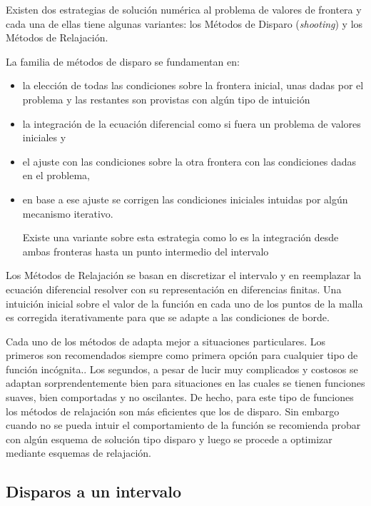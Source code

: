 \documentclass[spanish,titlepage,11pt]{article}
\begin{document}
Existen dos estrategias de soluci\'{o}n num\'{e}rica al problema de valores de
frontera y cada una de ellas tiene algunas variantes: los M\'{e}todos de
Disparo (\textit{shooting}) y los M\'{e}todos de Relajaci\'{o}n.

La familia de m\'{e}todos de disparo se fundamentan en:

\begin{itemize}
\item  la elecci\'{o}n de todas las condiciones sobre la frontera inicial,
unas dadas por el problema y las restantes son provistas con alg\'{u}n tipo de
intuici\'{o}n

\item  la integraci\'{o}n de la ecuaci\'{o}n diferencial como si fuera un
problema de valores iniciales y

\item  el ajuste con las condiciones sobre la otra frontera con las
condiciones dadas en el problema,

\item  en base a ese ajuste se corrigen las condiciones iniciales intuidas por
alg\'{u}n mecanismo iterativo.

Existe una variante sobre esta estrategia como lo es la integraci\'{o}n desde
ambas fronteras hasta un punto intermedio del intervalo
\end{itemize}

Los M\'{e}todos de Relajaci\'{o}n se basan en discretizar el intervalo y en
reemplazar la ecuaci\'{o}n diferencial resolver con su representaci\'{o}n en
diferencias finitas. Una intuici\'{o}n inicial sobre el valor de la
funci\'{o}n en cada uno de los puntos de la malla es corregida iterativamente
para que se adapte a las condiciones de borde.

Cada uno de los m\'{e}todos de adapta mejor a situaciones particulares. Los
primeros son recomendados siempre como primera opci\'{o}n para cualquier tipo
de funci\'{o}n inc\'{o}gnita.. Los segundos, a pesar de lucir muy complicados
y costosos se adaptan sorprendentemente bien para situaciones en las cuales se
tienen funciones suaves, bien comportadas y no oscilantes. De hecho, para este
tipo de funciones los m\'{e}todos de relajaci\'{o}n son m\'{a}s eficientes que
los de disparo. Sin embargo cuando no se pueda intuir el comportamiento de la
funci\'{o}n se recomienda probar con alg\'{u}n esquema de soluci\'{o}n tipo
disparo y luego se procede a optimizar mediante esquemas de relajaci\'{o}n.

\subsection{Disparos a un intervalo}
\end{document}
